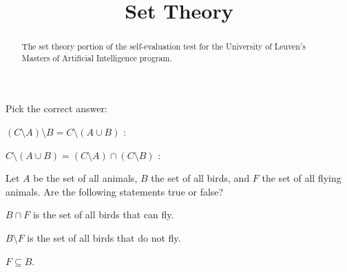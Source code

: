 \documentclass{ximera}
\title{Set Theory}
\begin{document}
\begin{abstract}
The set theory portion of the self-evaluation test for the
University of Leuven's Masters of Artificial Intelligence program.
\end{abstract}
\maketitle

Pick the correct answer:
\begin{question}
$(C \setminus A) \setminus B = C \setminus (A \cup B)$ :
\begin{solution}
\begin{multiple-choice}
\end{multiple-choice}
\end{solution}
\end{question}

\begin{question}
$C \setminus (A \cup B) = (C \setminus A) \cap (C\setminus B)$ :
\begin{solution}
\begin{multiple-choice}
\end{multiple-choice}
\end{solution}
\end{question}


\begin{question}
Let $A$ be the set of all animals, $B$ the set of all birds, and $F$
the set of all flying animals. Are the following statements true or false?

\begin{question}
$B\cap F$ is the set of all birds that can fly.
\begin{solution}
\begin{multiple-choice}
\end{multiple-choice}
\end{solution}
\end{question}

\begin{question}
$B\setminus F$ is the set of all birds that do not fly.
\begin{solution}
\begin{multiple-choice}
\end{multiple-choice}
\end{solution}
\end{question}

\begin{question}
$F\subseteq B$.
\begin{solution}
\begin{multiple-choice}
\end{multiple-choice}
\end{solution}
\end{question}

\end{question}
\end{document}
